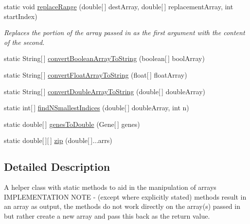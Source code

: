 \begin{DoxyCompactItemize}
static void \hyperlink{classuk_1_1ac_1_1dmu_1_1iesd_1_1cascade_1_1util_1_1_array_utils_a0c84c379ea03ddbde56b49941509abee}{replace\-Range} (double\mbox{[}$\,$\mbox{]} dest\-Array, double\mbox{[}$\,$\mbox{]} replacement\-Array, int start\-Index)
\begin{DoxyCompactList}\small\item\em Replaces the portion of the array passed in as the first argument with the content of the second. \end{DoxyCompactList}\item 
static String\mbox{[}$\,$\mbox{]} \hyperlink{classuk_1_1ac_1_1dmu_1_1iesd_1_1cascade_1_1util_1_1_array_utils_a72a3816e6663fcfe6c475471017de6b6}{convert\-Boolean\-Array\-To\-String} (boolean\mbox{[}$\,$\mbox{]} bool\-Array)
\item 
static String\mbox{[}$\,$\mbox{]} \hyperlink{classuk_1_1ac_1_1dmu_1_1iesd_1_1cascade_1_1util_1_1_array_utils_a9bed26719c44c677f315e2cd605bd46d}{convert\-Float\-Array\-To\-String} (float\mbox{[}$\,$\mbox{]} float\-Array)
\item 
static String\mbox{[}$\,$\mbox{]} \hyperlink{classuk_1_1ac_1_1dmu_1_1iesd_1_1cascade_1_1util_1_1_array_utils_aa38f78cbb6ffbea796174bf98d06c485}{convert\-Double\-Array\-To\-String} (double\mbox{[}$\,$\mbox{]} double\-Array)
\item 
static int\mbox{[}$\,$\mbox{]} \hyperlink{classuk_1_1ac_1_1dmu_1_1iesd_1_1cascade_1_1util_1_1_array_utils_a2f80bbf16c550ce9338986162a9bb34d}{find\-N\-Smallest\-Indices} (double\mbox{[}$\,$\mbox{]} double\-Array, int n)
\item 
static double\mbox{[}$\,$\mbox{]} \hyperlink{classuk_1_1ac_1_1dmu_1_1iesd_1_1cascade_1_1util_1_1_array_utils_aa5bfda6dac2f007f426ed7e68de6065d}{genes\-To\-Double} (Gene\mbox{[}$\,$\mbox{]} genes)
\item 
static double\mbox{[}$\,$\mbox{]}\mbox{[}$\,$\mbox{]} \hyperlink{classuk_1_1ac_1_1dmu_1_1iesd_1_1cascade_1_1util_1_1_array_utils_a092c64eed3ff6f015710418605adb09f}{zip} (double\mbox{[}$\,$\mbox{]}...arrs)
\end{DoxyCompactItemize}


\subsection{Detailed Description}
A helper class with static methods to aid in the manipulation of arrays I\-M\-P\-L\-E\-M\-E\-N\-T\-A\-T\-I\-O\-N N\-O\-T\-E -\/ (except where explicitly stated) methods result in an array as output, the methods do not work directly on the array(s) passed in but rather create a new array and pass this back as the return value. 

